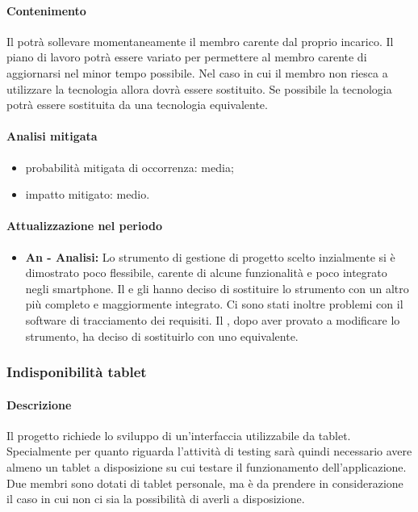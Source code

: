 			\paragraph{Contenimento}
			Il \responsabilediprogetto{} potrà sollevare momentaneamente il membro carente dal proprio incarico. Il piano di lavoro potrà essere variato per permettere al membro carente di aggiornarsi nel minor tempo possibile. Nel caso in cui il membro non riesca a utilizzare la tecnologia allora dovrà essere sostituito. Se possibile la tecnologia potrà essere sostituita da una tecnologia equivalente.
			\paragraph{Analisi mitigata}
			\begin{itemize}
			\item{probabilità mitigata di occorrenza:} media;
			\item{impatto mitigato:} medio.
			\end{itemize}
			\paragraph{Attualizzazione nel periodo}
				\begin{itemize}
				\item \textbf{\textbf{{An - Analisi}:}} Lo strumento di gestione di progetto scelto inzialmente si è dimostrato poco flessibile, carente di alcune funzionalità e poco integrato negli smartphone. Il \responsabilediprogetto{} e gli \amministratori{} hanno deciso di sostituire lo strumento con un altro più completo e maggiormente integrato. Ci sono stati inoltre problemi con il software di tracciamento dei requisiti. Il \responsabilediprogetto, dopo aver provato a modificare lo strumento, ha deciso di sostituirlo con uno equivalente.
				\end{itemize}

		\subsubsection{Indisponibilità tablet}
		\label{subsec:indisponibilitaTablet}
					\paragraph{Descrizione} Il progetto richiede lo sviluppo di un'interfaccia utilizzabile da tablet. Specialmente per quanto riguarda l'attività di testing sarà quindi necessario avere almeno un tablet a disposizione su cui testare il funzionamento dell'applicazione. Due membri sono dotati di tablet personale, ma è da prendere in considerazione il caso in cui non ci sia la possibilità di averli a disposizione.
